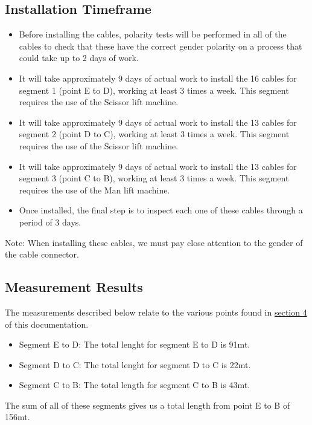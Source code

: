   \subsection{Installation Timeframe}
  \begin{itemize}
    \item Before installing the cables, polarity tests will be performed in all of the cables to check that these have the correct gender polarity on a process that could take up to 2 days of work.  
  
    \item It will take approximately 9 days of actual work to install the 16 cables for segment 1 (point E to D), working at least 3 times a week. This segment requires the use of the Scissor lift machine. 
  
    \item It will take approximately 9 days of actual work to install the 13 cables for segment 2 (point D to C), working at least 3 times a week. This segment requires the use of the Scissor lift machine.
  
    \item It will take approximately 9 days of actual work to install the 13 cables for segment 3 (point C to B), working at least 3 times a week. This segment requires the use of the Man lift machine.
  
    \item Once installed, the final step is to inspect each one of these cables through a period of 3 days. 
  \end{itemize}
  Note: When installing these cables, we must pay close attention to the gender of the cable connector.

\newpage

  \subsection{Measurement Results}
  
  The measurements described below relate to the various points found in \hyperref[sec:disconnectpoints]{section 4} of this documentation.
  
  \begin{itemize}
    \item Segment E to D: The total lenght for segment E to D is 91mt.
    \item Segment D to C: The total lenght for segment D to C is 22mt.
    \item Segment C to B: The total length for segment C to B is 43mt.
  \end{itemize}
  The sum of all of these segments gives us a total length from point E to B of 156mt.
